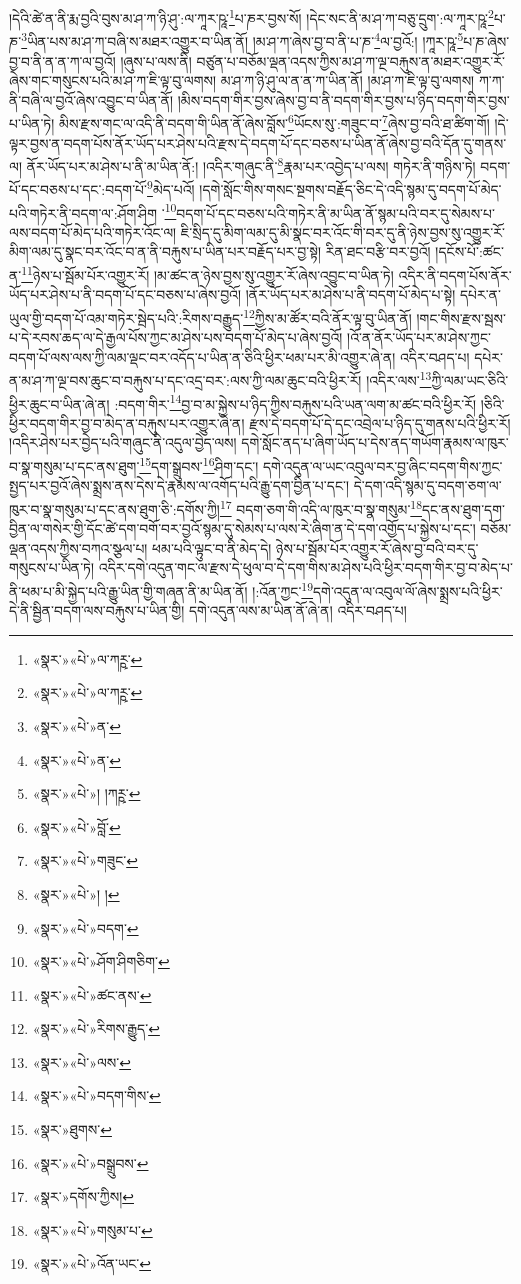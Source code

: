 །དེའི་ཚེ་ན་ནི་རྨ་བྱའི་བུས་མ་ཤ་ཀ་ཉི་ཤུ་:ལ་ཀཱར་ཥཱ་\footnote{«སྣར་»«པེ་»ལ་ཀཪྵ་}པ་ཎར་བྱས་སོ། །དེང་སང་ནི་མ་ཤ་ཀ་བཅུ་དྲུག་:ལ་ཀཱར་ཥཱ་\footnote{«སྣར་»«པེ་»ལ་ཀཪྵ་}པ་ཎ་\footnote{«སྣར་»«པེ་»ན་}ཡིན་པས་མ་ཤ་ཀ་བཞི་ས་མཐར་འགྱུར་བ་ཡིན་ནོ། །མ་ཤ་ཀ་ཞེས་བྱ་བ་ནི་པ་ཎ་\footnote{«སྣར་»«པེ་»ན་}ལ་བྱའོ:། །ཀཱར་ཥཱ་\footnote{«སྣར་»«པེ་»། །ཀཪྵ་}པ་ཎ་ཞེས་བྱ་བ་ནི་ན་ན་ཀ་ལ་བྱའོ། །ཞུས་པ་ལས་ནི། བཙུན་པ་བཅོམ་ལྡན་འདས་ཀྱིས་མ་ཤ་ཀ་ལྔ་བརྐུས་ན་མཐར་འགྱུར་རོ་ཞེས་གང་གསུངས་པའི་མ་ཤ་ཀ་ཇི་ལྟ་བུ་ལགས། མ་ཤ་ཀ་ཉི་ཤུ་ལ་ན་ན་ཀ་ཡིན་ནོ། །མ་ཤ་ཀ་ཇི་ལྟ་བུ་ལགས། ཀ་ཀ་ནི་བཞི་ལ་བྱའོ་ཞེས་འབྱུང་བ་ཡིན་ནོ། །མིས་བདག་གིར་བྱས་ཞེས་བྱ་བ་ནི་བདག་གིར་བྱས་པ་ཉིད་བདག་གིར་བྱས་པ་ཡིན་ཏེ། མིས་རྫས་གང་ལ་འདི་ནི་བདག་གི་ཡིན་ནོ་ཞེས་བློས་\footnote{«སྣར་»«པེ་»བློ་}ཡོངས་སུ་:གཟུང་བ་\footnote{«སྣར་»«པེ་»གཟུང་}ཞེས་བྱ་བའི་ཐ་ཚིག་གོ། །དེ་ལྟར་བྱས་ན་བདག་པོས་ནོར་ཡོད་པར་ཤེས་པའི་རྫས་དེ་བདག་པོ་དང་བཅས་པ་ཡིན་ནོ་ཞེས་བྱ་བའི་དོན་དུ་གནས་ལ། ནོར་ཡོད་པར་མ་ཤེས་པ་ནི་མ་ཡིན་ནོ:། །འདིར་གཞུང་ནི་\footnote{«སྣར་»«པེ་»། །}རྣམ་པར་འབྱེད་པ་ལས། གཏེར་ནི་གཉིས་ཏེ། བདག་པོ་དང་བཅས་པ་དང་:བདག་པོ་\footnote{«སྣར་»«པེ་»བདག་}མེད་པའོ། །དགེ་སློང་གིས་གསང་སྔགས་བརྗོད་ཅིང་དེ་འདི་སྙམ་དུ་བདག་པོ་མེད་པའི་གཏེར་ནི་བདག་ལ་:ཤོག་ཤིག ་\footnote{«སྣར་»«པེ་»ཤོག་ཤིགཅིག་}བདག་པོ་དང་བཅས་པའི་གཏེར་ནི་མ་ཡིན་ནོ་སྙམ་པའི་བར་དུ་སེམས་པ་ལས་བདག་པོ་མེད་པའི་གཏེར་འོང་ལ། ཇི་སྲིད་དུ་མིག་ལམ་དུ་མི་སྣང་བར་འོང་གི་བར་དུ་ནི་ཉེས་བྱས་སུ་འགྱུར་རོ་མིག་ལམ་དུ་སྣང་བར་འོང་བ་ན་ནི་བརྐུས་པ་ཡིན་པར་བརྗོད་པར་བྱ་སྟེ། རིན་ཐང་བརྩི་བར་བྱའོ། །དངོས་པོ་:ཚང་ན་\footnote{«སྣར་»«པེ་»ཚང་ནས་}ཉེས་པ་སྦོམ་པོར་འགྱུར་རོ། །མ་ཚང་ན་ཉེས་བྱས་སུ་འགྱུར་རོ་ཞེས་འབྱུང་བ་ཡིན་ཏེ། འདིར་ནི་བདག་པོས་ནོར་ཡོད་པར་ཤེས་པ་ནི་བདག་པོ་དང་བཅས་པ་ཞེས་བྱའོ། །ནོར་ཡོད་པར་མ་ཤེས་པ་ནི་བདག་པོ་མེད་པ་སྟེ། དཔེར་ན་ཡུལ་གྱི་བདག་པོ་འམ་གཏེར་སྦེད་པའི་:རིགས་བརྒྱུད་\footnote{«སྣར་»«པེ་»རིགས་རྒྱུད་}ཀྱིས་མ་ཚོར་བའི་ནོར་ལྟ་བུ་ཡིན་ནོ། །གང་གིས་རྫས་སྦས་པ་དེ་རབས་ཆད་ལ་དེ་རྒྱལ་པོས་ཀྱང་མ་ཤེས་པས་བདག་པོ་མེད་པ་ཞེས་བྱའོ། །འོ་ན་ནོར་ཡོད་པར་མ་ཤེས་ཀྱང་བདག་པོ་ལས་ལས་ཀྱི་ལམ་ལྡང་བར་འདོད་པ་ཡིན་ན་ཅིའི་ཕྱིར་ཕམ་པར་མི་འགྱུར་ཞེ་ན། འདིར་བཤད་པ། དཔེར་ན་མ་ཤ་ཀ་ལྔ་བས་ཆུང་བ་བརྐུས་པ་དང་འདྲ་བར་:ལས་ཀྱི་ལམ་ཆུང་བའི་ཕྱིར་རོ། །འདིར་ལས་\footnote{«སྣར་»«པེ་»ལས་}ཀྱི་ལམ་ཡང་ཅིའི་ཕྱིར་ཆུང་བ་ཡིན་ཞེ་ན། :བདག་གིར་\footnote{«སྣར་»«པེ་»བདག་གིས་}བྱ་བ་མ་སྐྱེས་པ་ཉིད་ཀྱིས་བརྐུས་པའི་ཡན་ལག་མ་ཚང་བའི་ཕྱིར་རོ། །ཅིའི་ཕྱིར་བདག་གིར་བྱ་བ་མེད་ན་བརྐུས་པར་འགྱུར་ཞེ་ན། རྫས་དེ་བདག་པོ་དེ་དང་འབྲེལ་པ་ཉིད་དུ་གནས་པའི་ཕྱིར་རོ། །འདིར་ཤེས་པར་བྱེད་པའི་གཞུང་ནི་འདུལ་བྱེད་ལས། དགེ་སློང་ནད་པ་ཞིག་ཡོད་པ་དེས་ནད་གཡོག་རྣམས་ལ་ཁུར་བ་སྣ་གསུམ་པ་དང་ནས་ཐུག་\footnote{«སྣར་»ཐུགས་}དག་སྒྲུབས་\footnote{«སྣར་»«པེ་»བསྒྲུབས་}ཤིག་དང་། དགེ་འདུན་ལ་ཡང་འབུལ་བར་བྱ་ཞིང་བདག་གིས་ཀྱང་སྤྱད་པར་བྱའོ་ཞེས་སྨྲས་ནས་དེས་དེ་རྣམས་ལ་འགོད་པའི་རྒྱུ་དག་བྱིན་པ་དང་། དེ་དག་འདི་སྙམ་དུ་བདག་ཅག་ལ་ཁུར་བ་སྣ་གསུམ་པ་དང་ནས་ཐུག་ཅི་:དགོས་ཀྱི།\footnote{«སྣར་»དགོས་ཀྱིས།} བདག་ཅག་གི་འདི་ལ་ཁུར་བ་སྣ་གསུམ་\footnote{«སྣར་»«པེ་»གསུམ་པ་}དང་ནས་ཐུག་དག་བྱིན་ལ་གསེར་གྱི་དོང་ཚེ་དག་བགོ་བར་བྱའོ་སྙམ་དུ་སེམས་པ་ལས་རེ་ཞིག་ན་དེ་དག་འགྱོད་པ་སྐྱེས་པ་དང་། བཅོམ་ལྡན་འདས་ཀྱིས་བཀའ་སྩལ་པ། ཕམ་པའི་ལྟུང་བ་ནི་མེད་དེ། ཉེས་པ་སྦོམ་པོར་འགྱུར་རོ་ཞེས་བྱ་བའི་བར་དུ་གསུངས་པ་ཡིན་ཏེ། འདིར་དགེ་འདུན་གང་ལ་རྫས་དེ་ཕུལ་བ་དེ་དག་གིས་མ་ཤེས་པའི་ཕྱིར་བདག་གིར་བྱ་བ་མེད་པ་ནི་ཕམ་པ་མི་སྐྱེད་པའི་རྒྱུ་ཡིན་གྱི་གཞན་ནི་མ་ཡིན་ནོ། །:འོན་ཀྱང་\footnote{«སྣར་»«པེ་»འོན་ཡང་}དགེ་འདུན་ལ་འབུལ་ལོ་ཞེས་སྨྲས་པའི་ཕྱིར་དེ་ནི་སྦྱིན་བདག་ལས་བརྐུས་པ་ཡིན་གྱི། དགེ་འདུན་ལས་མ་ཡིན་ནོ་ཞེ་ན། འདིར་བཤད་པ། 